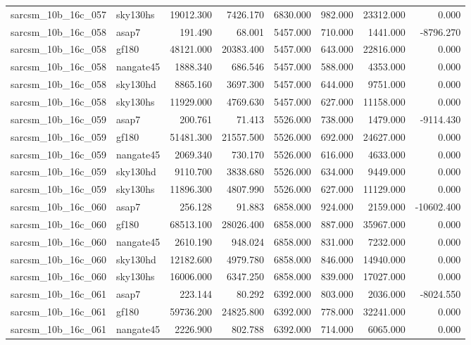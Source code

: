 \begin{tabular}{llrrrrrr}
sarcsm\_10b\_16c\_057 & sky130hs & 19012.300 & 7426.170 & 6830.000 & 982.000 & 23312.000 & 0.000 \\
sarcsm\_10b\_16c\_058 & asap7 & 191.490 & 68.001 & 5457.000 & 710.000 & 1441.000 & -8796.270 \\
sarcsm\_10b\_16c\_058 & gf180 & 48121.000 & 20383.400 & 5457.000 & 643.000 & 22816.000 & 0.000 \\
sarcsm\_10b\_16c\_058 & nangate45 & 1888.340 & 686.546 & 5457.000 & 588.000 & 4353.000 & 0.000 \\
sarcsm\_10b\_16c\_058 & sky130hd & 8865.160 & 3697.300 & 5457.000 & 644.000 & 9751.000 & 0.000 \\
sarcsm\_10b\_16c\_058 & sky130hs & 11929.000 & 4769.630 & 5457.000 & 627.000 & 11158.000 & 0.000 \\
sarcsm\_10b\_16c\_059 & asap7 & 200.761 & 71.413 & 5526.000 & 738.000 & 1479.000 & -9114.430 \\
sarcsm\_10b\_16c\_059 & gf180 & 51481.300 & 21557.500 & 5526.000 & 692.000 & 24627.000 & 0.000 \\
sarcsm\_10b\_16c\_059 & nangate45 & 2069.340 & 730.170 & 5526.000 & 616.000 & 4633.000 & 0.000 \\
sarcsm\_10b\_16c\_059 & sky130hd & 9110.700 & 3838.680 & 5526.000 & 634.000 & 9449.000 & 0.000 \\
sarcsm\_10b\_16c\_059 & sky130hs & 11896.300 & 4807.990 & 5526.000 & 627.000 & 11129.000 & 0.000 \\
sarcsm\_10b\_16c\_060 & asap7 & 256.128 & 91.883 & 6858.000 & 924.000 & 2159.000 & -10602.400 \\
sarcsm\_10b\_16c\_060 & gf180 & 68513.100 & 28026.400 & 6858.000 & 887.000 & 35967.000 & 0.000 \\
sarcsm\_10b\_16c\_060 & nangate45 & 2610.190 & 948.024 & 6858.000 & 831.000 & 7232.000 & 0.000 \\
sarcsm\_10b\_16c\_060 & sky130hd & 12182.600 & 4979.780 & 6858.000 & 846.000 & 14940.000 & 0.000 \\
sarcsm\_10b\_16c\_060 & sky130hs & 16006.000 & 6347.250 & 6858.000 & 839.000 & 17027.000 & 0.000 \\
sarcsm\_10b\_16c\_061 & asap7 & 223.144 & 80.292 & 6392.000 & 803.000 & 2036.000 & -8024.550 \\
sarcsm\_10b\_16c\_061 & gf180 & 59736.200 & 24825.800 & 6392.000 & 778.000 & 32241.000 & 0.000 \\
sarcsm\_10b\_16c\_061 & nangate45 & 2226.900 & 802.788 & 6392.000 & 714.000 & 6065.000 & 0.000 \\

\end{tabular}
